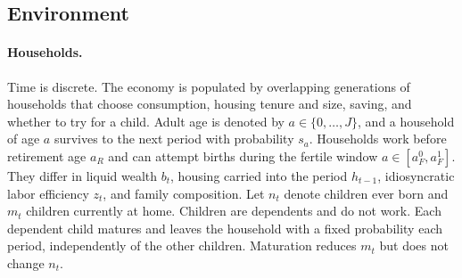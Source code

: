 \subsection{Environment}
\label{subsec:quantitative-environment}

\paragraph{Households.}
Time is discrete. The economy is populated by overlapping generations of
households that choose consumption, housing tenure and size, saving, and
whether to try for a child. Adult age is denoted by $a\in\{0,\ldots,J\}$,
and a household of age $a$ survives to the next period with probability $s_a$.
Households work before retirement age $a_R$ and can attempt births during the
fertile window $a\in[a_F^0,a_F^1]$. They differ in liquid wealth $b_t$,
housing carried into the period $h_{t-1}$, idiosyncratic labor efficiency $z_t$, and family
composition. Let $n_t$ denote children ever born and $m_t$ children currently
at home. Children are dependents and do not work. Each dependent child matures
and leaves the household with a fixed probability each period, independently
of the other children. Maturation reduces $m_t$ but does not change $n_t$.

